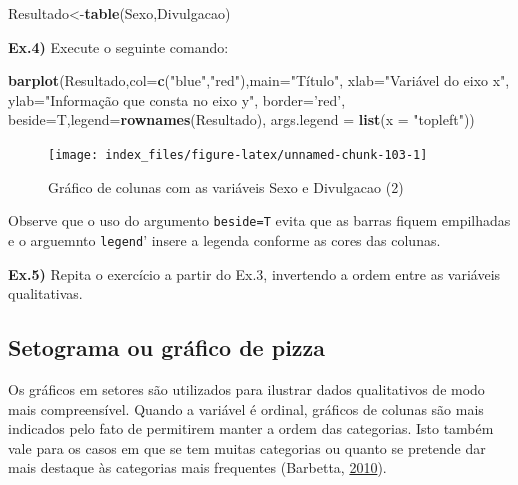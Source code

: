 \documentclass[12pt,brazil,oneside]{book}
\newenvironment{Shaded}{\begin{snugshade}}{\end{snugshade}}
\newcommand{\DataTypeTok}[1]{\textcolor[rgb]{0.13,0.29,0.53}{#1}}
\newcommand{\KeywordTok}[1]{\textcolor[rgb]{0.13,0.29,0.53}{\textbf{#1}}}
\newcommand{\NormalTok}[1]{#1}
\newcommand{\StringTok}[1]{\textcolor[rgb]{0.31,0.60,0.02}{#1}}
\begin{document}
\begin{Shaded}
\begin{Highlighting}[]
\NormalTok{Resultado<-}\KeywordTok{table}\NormalTok{(Sexo,Divulgacao)}
\end{Highlighting}
\end{Shaded}

\textbf{Ex.4)} Execute o seguinte comando:

\begin{Shaded}
\begin{Highlighting}[]
\KeywordTok{barplot}\NormalTok{(Resultado,}\DataTypeTok{col=}\KeywordTok{c}\NormalTok{(}\StringTok{"blue"}\NormalTok{,}\StringTok{"red"}\NormalTok{),}\DataTypeTok{main=}\StringTok{"Título"}\NormalTok{,}
        \DataTypeTok{xlab=}\StringTok{"Variável do eixo x"}\NormalTok{,}
        \DataTypeTok{ylab=}\StringTok{"Informação que consta no eixo y"}\NormalTok{, }
        \DataTypeTok{border=}\StringTok{'red'}\NormalTok{, }
        \DataTypeTok{beside=}\NormalTok{T,}\DataTypeTok{legend=}\KeywordTok{rownames}\NormalTok{(Resultado),}
        \DataTypeTok{args.legend =} \KeywordTok{list}\NormalTok{(}\DataTypeTok{x =} \StringTok{"topleft"}\NormalTok{))}
\end{Highlighting}
\end{Shaded}

\begin{figure}[H]

{\centering \texttt{[image: index\_files/figure-latex/unnamed-chunk-103-1]} 

}

\caption{Gráfico de colunas com as variáveis Sexo e Divulgacao (2)}\label{fig:unnamed-chunk-103}
\end{figure}

Observe que o uso do argumento \texttt{beside=T} evita que as barras fiquem empilhadas e o arguemnto \texttt{legend}' insere a legenda conforme as cores das colunas.

\textbf{Ex.5)} Repita o exercício a partir do Ex.3, invertendo a ordem entre as variáveis qualitativas.

\hypertarget{setograma-ou-grafico-de-pizza}{%
\subsection{Setograma ou gráfico de pizza}\label{setograma-ou-grafico-de-pizza}}

Os gráficos em setores são utilizados para ilustrar dados qualitativos de modo mais compreensível. Quando a variável é ordinal, gráficos de colunas são mais indicados pelo fato de permitirem manter a ordem das categorias. Isto também vale para os casos em que se tem muitas categorias ou quanto se pretende dar mais destaque às categorias mais frequentes (Barbetta, \protect\hyperlink{ref-barbetta1988}{2010}).
\end{document}
